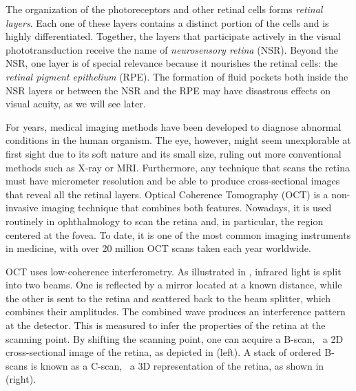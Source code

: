 The organization of the photoreceptors and other retinal cells forms \textit{retinal layers}. Each one of these layers contains a distinct portion of the cells and is highly differentiated. Together, the layers that participate actively in the visual phototransduction receive the name of \textit{neurosensory retina} (NSR). Beyond the NSR, one layer is of special relevance because it nourishes the retinal cells: the \textit{retinal pigment epithelium} (RPE). The formation of fluid pockets both inside the NSR layers or between the NSR and the RPE may have disastrous effects on visual acuity, as we will see later.


For years, medical imaging methods have been developed to diagnose abnormal conditions in the human organism. The eye, however, might seem unexplorable at first sight due to its soft nature and its small size, ruling out more conventional methods such as X-ray or MRI. Furthermore, any technique that scans the retina must have micrometer resolution and be able to produce cross-sectional images that reveal all the retinal layers. Optical Coherence Tomography (OCT) is a non-invasive imaging technique that combines both features. Nowadays, it is used routinely in ophthalmology to scan the retina and, in particular, the region centered at the fovea. To date, it is one of the most common imaging instruments in medicine, with over 20 million OCT scans taken each year worldwide.

OCT uses low-coherence interferometry. As illustrated in , infrared light is split into two beams. One is reflected by a mirror located at a known distance, while the other is sent to the retina and scattered back to the beam splitter, which combines their amplitudes. The combined wave produces an interference pattern at the detector. This is measured to infer the properties of the retina at the scanning point. By shifting the scanning point, one can acquire a B-scan, \ie~a 2D cross-sectional image of the retina, as depicted in  (left). A stack of ordered B-scans is known as a C-scan, \ie~a 3D representation of the retina, as shown in  (right).

